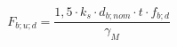 \documentclass[12pt]{article}
\begin{document}
\begin{displaymath}
F_{b;u;d} = \frac {1,5 \cdot k_s \cdot d_{b;nom} \cdot t \cdot f_{b;d} } {\gamma_M}
\end{displaymath}
\end{document}
